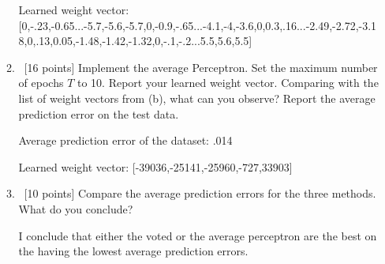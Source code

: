 \documentclass[12pt, fullpage,letterpaper]{article}
\begin{document}
\begin{enumerate}
\begin{enumerate}
Learned weight vector: [0,-.23,-0.65...-5.7,-5.6,-5.7,0,-0.9,-.65...-4.1,-4,-3.6,0,0.3,.16...-2.49,-2.72,-3.18,0,.13,0.05,-1.48,-1.42,-1.32,0,-.1,-.2...5.5,5.6,5.5]

	\item~[16 points] Implement the average Perceptron. Set the maximum number of epochs $T$ to 10. Report your learned weight vector. Comparing with the list of weight vectors from (b), what can you observe? Report the average prediction error on the test data.  \newline

Average prediction error of the dataset: .014

Learned weight vector: [-39036,-25141,-25960,-727,33903]

	\item~[10 points] Compare the average prediction errors for the three methods. What do you conclude?   \newline

	I conclude that either the voted or the average perceptron are the best on the having the lowest average prediction errors. 
\end{enumerate}


\end{enumerate}
\end{document}
